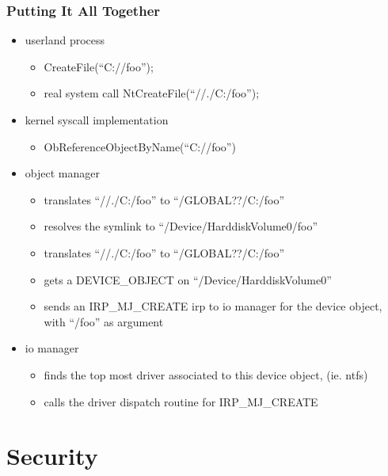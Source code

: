\begin{frame}
  \frametitle{Putting It All Together}

  \begin{itemize}
    \item
      userland process
      \begin{itemize}
        \item
          CreateFile(``C://foo'');
        \item
          real system call NtCreateFile(``//./C:/foo'');
      \end{itemize}

    \item
      kernel syscall implementation
      \begin{itemize}
        \item
          ObReferenceObjectByName(``C://foo'')
      \end{itemize}

    \item
      object manager
      \begin{itemize}
        \item
          translates ``//./C:/foo'' to ``/GLOBAL??/C:/foo''
        \item
          resolves the symlink to ``/Device/HarddiskVolume0/foo''
        \item
          translates ``//./C:/foo'' to ``/GLOBAL??/C:/foo''
        \item
          gets a DEVICE\_OBJECT on ``/Device/HarddiskVolume0''
        \item
          sends an IRP\_MJ\_CREATE irp to io manager for the device object,  with ``/foo'' as argument
      \end{itemize}

    \item
      io manager
      \begin{itemize}
        \item
          finds the top most driver associated to this device object, (ie. ntfs)
        \item
          calls the driver dispatch routine for IRP\_MJ\_CREATE
      \end{itemize}

  \end{itemize}

\end{frame}

%
%

\section{Security}


